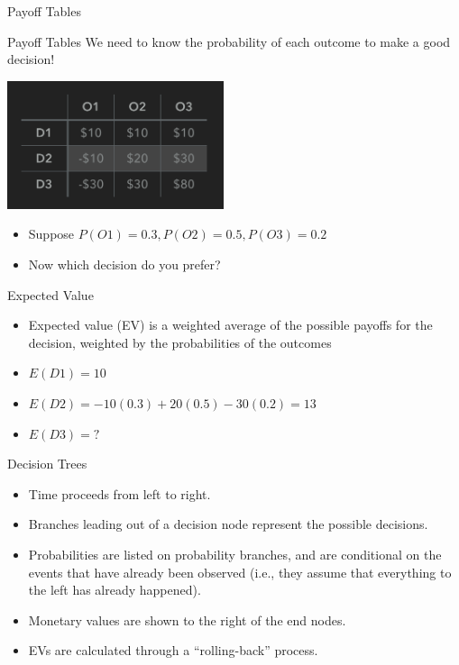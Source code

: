 \documentclass{beamer}\usepackage[]{graphicx}\usepackage[]{color}
\begin{document}
\begin{darkframes}
\begin{frame}[fragile]{Payoff Tables}
      \lc %
    \end{frame}


    \begin{frame}[fragile]{Payoff Tables}
      We need to know the probability of each outcome to make a good decision!
      \begin{center}
        \includegraphics[width=2.5in]{PayoffTable} 
      \end{center}
        \begin{itemize}
            \item Suppose $P(O1) = 0.3, P(O2) = 0.5, P(O3) = 0.2$
            \item Now which decision do you prefer?
        \end{itemize}

    \end{frame}


    \begin{frame}[fragile]{Expected Value}
         \begin{itemize}[<+->]
            \item Expected value (EV) is a weighted average of the possible payoffs for the decision,
            weighted by the probabilities of the outcomes
            \item $E(D1) = 10$
            \item $E(D2) = -10(0.3) + 20(0.5) - 30(0.2) = 13$
            \item $E(D3) = ?$
        \end{itemize}    

      \lc %
    \end{frame}


    \begin{frame}[fragile]{Decision Trees}
          \begin{itemize}
            \item Time proceeds from left to right. \pause
            \item Branches leading out of a decision node represent the possible decisions. \pause
            \item Probabilities are listed on probability branches, and are conditional on the events that have already been observed (i.e., they assume that everything to the left has already happened). \pause
            \item Monetary values are shown to the right of the end nodes. \pause
            \item EVs are calculated through a ``rolling-back'' process.
          \end{itemize}  
    \end{frame}



\end{darkframes}
\end{document}
